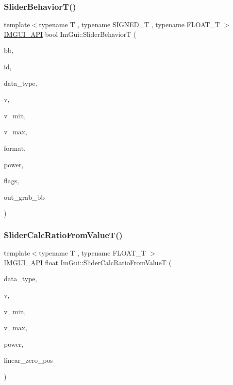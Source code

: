 \subsubsection{\texorpdfstring{Slider\+Behavior\+T()}{SliderBehaviorT()}}
{\footnotesize\ttfamily template$<$typename T , typename S\+I\+G\+N\+E\+D\+\_\+T , typename F\+L\+O\+A\+T\+\_\+T $>$ \\
\mbox{\hyperlink{imgui_8h_a43829975e84e45d1149597467a14bbf5}{I\+M\+G\+U\+I\+\_\+\+A\+PI}} bool Im\+Gui\+::\+Slider\+BehaviorT (\begin{DoxyParamCaption}\item[{const \mbox{\hyperlink{struct_im_rect}{Im\+Rect}} \&}]{bb,  }\item[{\mbox{\hyperlink{imgui_8h_a1785c9b6f4e16406764a85f32582236f}{Im\+Gui\+ID}}}]{id,  }\item[{\mbox{\hyperlink{imgui_8h_a4cfa8697a3d76722fff83eb18922e9d5}{Im\+Gui\+Data\+Type}}}]{data\+\_\+type,  }\item[{T $\ast$}]{v,  }\item[{const T}]{v\+\_\+min,  }\item[{const T}]{v\+\_\+max,  }\item[{const char $\ast$}]{format,  }\item[{float}]{power,  }\item[{\mbox{\hyperlink{imgui__internal_8h_a50cc3e3e4beb155e2186f8c1dc057e18}{Im\+Gui\+Slider\+Flags}}}]{flags,  }\item[{\mbox{\hyperlink{struct_im_rect}{Im\+Rect}} $\ast$}]{out\+\_\+grab\+\_\+bb }\end{DoxyParamCaption})}

\mbox{\label{namespace_im_gui_adbcf6e29a3059e11aebe37d89cc77991}} 
\subsubsection{\texorpdfstring{Slider\+Calc\+Ratio\+From\+Value\+T()}{SliderCalcRatioFromValueT()}}
{\footnotesize\ttfamily template$<$typename T , typename F\+L\+O\+A\+T\+\_\+T $>$ \\
\mbox{\hyperlink{imgui_8h_a43829975e84e45d1149597467a14bbf5}{I\+M\+G\+U\+I\+\_\+\+A\+PI}} float Im\+Gui\+::\+Slider\+Calc\+Ratio\+From\+ValueT (\begin{DoxyParamCaption}\item[{\mbox{\hyperlink{imgui_8h_a4cfa8697a3d76722fff83eb18922e9d5}{Im\+Gui\+Data\+Type}}}]{data\+\_\+type,  }\item[{T}]{v,  }\item[{T}]{v\+\_\+min,  }\item[{T}]{v\+\_\+max,  }\item[{float}]{power,  }\item[{float}]{linear\+\_\+zero\+\_\+pos }\end{DoxyParamCaption})}

